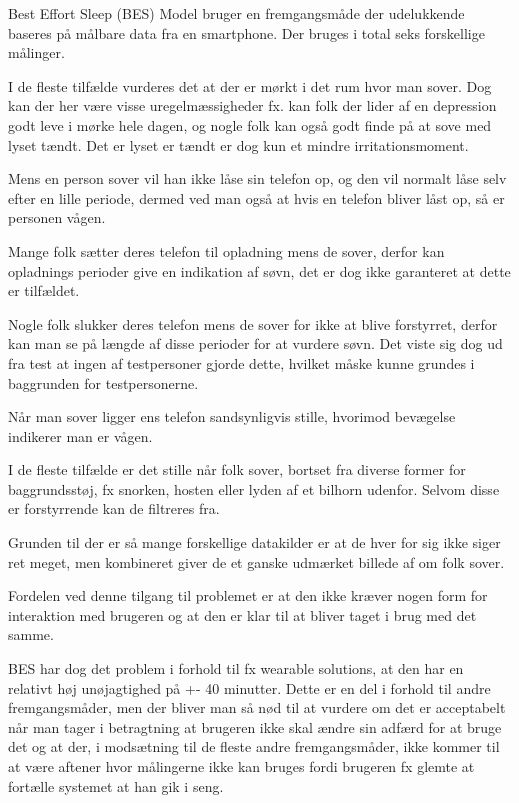 Best Effort Sleep (BES) Model bruger en fremgangsmåde der udelukkende baseres på målbare data fra en smartphone. Der bruges i total seks forskellige målinger.
\begin{description}[style=nextline]
\item[Lys]
I de fleste tilfælde vurderes det at der er mørkt i det rum hvor man sover. Dog kan der her være visse uregelmæssigheder fx. kan folk der lider af en depression godt leve i mørke hele dagen, og nogle folk kan også godt finde på at sove med lyset tændt. Det er lyset er tændt er dog kun et mindre irritationsmoment.
\item[Varighed af telefonens låste perioder]
Mens en person sover vil han ikke låse sin telefon op, og den vil normalt låse selv efter en lille periode, dermed ved man også at hvis en telefon bliver låst op, så er personen vågen.
\item[Telefonens opladnings perioder]
Mange folk sætter deres telefon til opladning mens de sover, derfor kan opladnings perioder give en indikation af søvn, det er dog ikke garanteret at dette er tilfældet.
\item[Telefon slukket]
Nogle folk slukker deres telefon mens de sover for ikke at blive forstyrret, derfor kan man se på længde af disse perioder for at vurdere søvn. Det viste sig dog ud fra test at ingen af testpersoner gjorde dette, hvilket måske kunne grundes i baggrunden for testpersonerne. 
\item[Bevægelse]
Når man sover ligger ens telefon sandsynligvis stille, hvorimod bevægelse indikerer man er vågen.
\item[Lyd]
I de fleste tilfælde er det stille når folk sover, bortset fra diverse former for baggrundsstøj, fx snorken, hosten eller  lyden af et bilhorn udenfor. Selvom disse er forstyrrende kan de filtreres fra.
\end{description}

Grunden til der er så mange forskellige datakilder er at de hver for sig ikke siger ret meget, men kombineret giver de et ganske udmærket billede af om folk sover.

Fordelen ved denne tilgang til problemet er at den ikke kræver nogen form for interaktion med brugeren og at den er klar til at bliver taget i brug med det samme.

BES har dog det problem i forhold til fx wearable solutions, at den har en relativt høj unøjagtighed på +- 40 minutter. 
Dette er en del i forhold til andre fremgangsmåder, men der bliver man så nød til at vurdere om det er acceptabelt når man tager i betragtning at brugeren ikke skal ændre sin adfærd for at bruge det og at der, i modsætning til de fleste andre fremgangsmåder, ikke kommer til at være aftener hvor målingerne ikke kan bruges fordi brugeren fx glemte at fortælle systemet at han gik i seng.
 
